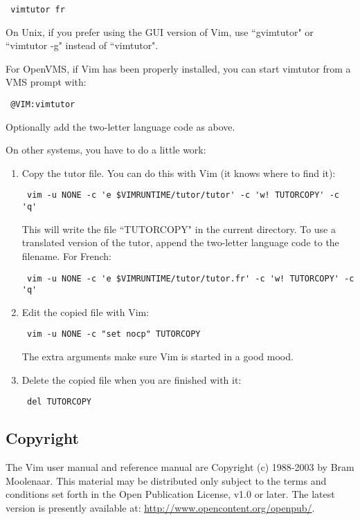 \begin{verbatim}
 vimtutor fr
\end{verbatim}

On Unix, if you prefer using the GUI version of Vim, use ``gvimtutor" or
``vimtutor -g" instead of ``vimtutor".

For OpenVMS, if Vim has been properly installed, you can start vimtutor from a
VMS prompt with:

\begin{verbatim}
 @VIM:vimtutor
\end{verbatim}

Optionally add the two-letter language code as above.

On other systems, you have to do a little work:
\begin{enumerate}
				\item Copy the tutor file. You can do this with Vim (it knows where to find it):
								\begin{verbatim}
 vim -u NONE -c 'e $VIMRUNTIME/tutor/tutor' -c 'w! TUTORCOPY' -c 'q'
								\end{verbatim}
								This will write the file ``TUTORCOPY" in the current directory.
								To use a
								translated version of the tutor, append the two-letter language code to the
								filename. For French:
								\begin{verbatim}
 vim -u NONE -c 'e $VIMRUNTIME/tutor/tutor.fr' -c 'w! TUTORCOPY' -c 'q'
								\end{verbatim}

				\item Edit the copied file with Vim:
								\begin{verbatim}
 vim -u NONE -c "set nocp" TUTORCOPY
								\end{verbatim}
								The extra arguments make sure Vim is started in a good mood.

				\item Delete the copied file when you are finished with it:
								\begin{verbatim}
 del TUTORCOPY
								\end{verbatim}
\end{enumerate}
\subsection{Copyright}
\label{manual-copyright}

The Vim user manual and reference manual are Copyright (c) 1988-2003 by Bram Moolenaar.
This material may be distributed only subject to the terms and conditions set forth in the Open Publication License, v1.0 or later.
The latest version is presently available at: \url{http://www.opencontent.org/openpub/}.

